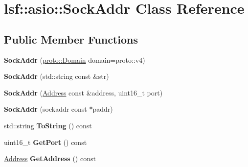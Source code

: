\hypertarget{classlsf_1_1asio_1_1SockAddr}{
\section{lsf::asio::SockAddr Class Reference}
\label{classlsf_1_1asio_1_1SockAddr}
}
\subsection*{Public Member Functions}
\begin{DoxyCompactItemize}
\item 
\hypertarget{classlsf_1_1asio_1_1SockAddr_aea1bbbd8a7422c048e1ffc76a7fda352}{
{\bfseries SockAddr} (\hyperlink{classlsf_1_1asio_1_1proto_1_1Domain}{proto::Domain} domain=proto::v4)}
\label{classlsf_1_1asio_1_1SockAddr_aea1bbbd8a7422c048e1ffc76a7fda352}

\item 
\hypertarget{classlsf_1_1asio_1_1SockAddr_a321d7e79df0fc0102dba4b19aaacdc0b}{
{\bfseries SockAddr} (std::string const \&str)}
\label{classlsf_1_1asio_1_1SockAddr_a321d7e79df0fc0102dba4b19aaacdc0b}

\item 
\hypertarget{classlsf_1_1asio_1_1SockAddr_a77c0fe31ca978859ed798e751a97f700}{
{\bfseries SockAddr} (\hyperlink{classlsf_1_1asio_1_1Address}{Address} const \&address, uint16\_\-t port)}
\label{classlsf_1_1asio_1_1SockAddr_a77c0fe31ca978859ed798e751a97f700}

\item 
\hypertarget{classlsf_1_1asio_1_1SockAddr_ab9e989b96e5235081ebb7d6a9412fbe3}{
{\bfseries SockAddr} (sockaddr const $\ast$paddr)}
\label{classlsf_1_1asio_1_1SockAddr_ab9e989b96e5235081ebb7d6a9412fbe3}

\item 
\hypertarget{classlsf_1_1asio_1_1SockAddr_a604abd8a96b80017eaf0b9e18c7a3705}{
std::string {\bfseries ToString} () const }
\label{classlsf_1_1asio_1_1SockAddr_a604abd8a96b80017eaf0b9e18c7a3705}

\item 
\hypertarget{classlsf_1_1asio_1_1SockAddr_a65eabf4c5f172a24a4da94749a09e404}{
uint16\_\-t {\bfseries GetPort} () const }
\label{classlsf_1_1asio_1_1SockAddr_a65eabf4c5f172a24a4da94749a09e404}

\item 
\hypertarget{classlsf_1_1asio_1_1SockAddr_a6c9941736b4aaaa25b46599b9eedc313}{
\hyperlink{classlsf_1_1asio_1_1Address}{Address} {\bfseries GetAddress} () const }
\label{classlsf_1_1asio_1_1SockAddr_a6c9941736b4aaaa25b46599b9eedc313}


\end{DoxyCompactItemize}
